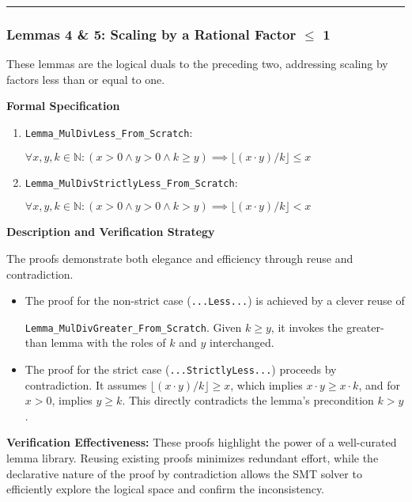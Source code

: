 \documentclass[
  english,
  onecolumn]{article}
\begin{document}
\begin{center}\rule{0.5\linewidth}{0.5pt}\end{center}

\subsubsection{\texorpdfstring{\textbf{Lemmas 4 \& 5: Scaling by a
Rational Factor \(\leq\)
1}}{Lemmas 4 \& 5: Scaling by a Rational Factor \textbackslash leq 1}}\label{lemmas-4-5-scaling-by-a-rational-factor-leq-1}

These lemmas are the logical duals to the preceding two, addressing
scaling by factors less than or equal to one.

\textbf{Formal Specification}

\begin{enumerate}
\def\labelenumi{\arabic{enumi}.}
\item
  \texttt{Lemma\_MulDivLess\_From\_Scratch}:

  \(\forall x, y, k \in \mathbb{N} : (x > 0 \land y > 0 \land k \ge y) \implies \lfloor(x \cdot y) / k\rfloor \le x\)
\item
  \texttt{Lemma\_MulDivStrictlyLess\_From\_Scratch}:

  \(\forall x, y, k \in \mathbb{N} : (x > 0 \land y > 0 \land k > y) \implies \lfloor(x \cdot y) / k\rfloor < x\)
\end{enumerate}

\textbf{Description and Verification Strategy}

The proofs demonstrate both elegance and efficiency through reuse and
contradiction.

\begin{itemize}
\item
  The proof for the non-strict case (\texttt{...Less...}) is achieved by
  a clever reuse of

  \texttt{Lemma\_MulDivGreater\_From\_Scratch}. Given \(k \ge y\), it
  invokes the greater-than lemma with the roles of \(k\) and \(y\)
  interchanged.
\item
  The proof for the strict case (\texttt{...StrictlyLess...}) proceeds
  by contradiction. It assumes \(\lfloor(x \cdot y)/k\rfloor \ge x\),
  which implies \(x \cdot y \ge x \cdot k\), and for \(x > 0\), implies
  \(y \ge k\). This directly contradicts the lemma's precondition
  \(k > y\).
\end{itemize}

\textbf{Verification Effectiveness:} These proofs highlight the power of
a well-curated lemma library. Reusing existing proofs minimizes
redundant effort, while the declarative nature of the proof by
contradiction allows the SMT solver to efficiently explore the logical
space and confirm the inconsistency.
\end{document}
